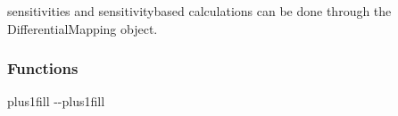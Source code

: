 \documentclass[letterpaper,10pt,english]{sphinxmanual}
\begin{document}
\sphinxAtStartPar
sensitivities and sensitivity\sphinxhyphen{}based calculations can be done through the DifferentialMapping object.
\subsubsection*{Functions}


\begin{savenotes}
\sphinxatlongtablestart
\sphinxthistablewithglobalstyle
\sphinxthistablewithnovlinesstyle
\makeatletter
  \LTleft \@totalleftmargin plus1fill
  \LTright\dimexpr\columnwidth-\@totalleftmargin-\linewidth\relax plus1fill
\makeatother
\begin{longtable}{}
\sphinxtoprule
\endfirsthead

\\
\sphinxtoprule
\endhead

\sphinxbottomrule
{}\\
\endfoot

\endlastfoot
\sphinxtableatstartofbodyhook


\end{longtable}
\end{savenotes}
\end{document}
